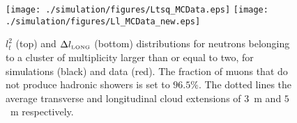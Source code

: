 \begin{figure}[htb]
    \centering
   \texttt{[image: ./simulation/figures/Ltsq\_MCData.eps]}
    \texttt{[image: ./simulation/figures/Ll\_MCData\_new.eps]}
    
    
    \caption{$l_t^2$ (top) and $\Delta l_{\mbox{\tiny LONG}}$ (bottom) distributions for neutrons belonging to a cluster of multiplicity larger than or equal to two, for simulations (black) and data (red). The fraction of muons that do not produce hadronic showers is set to $96.5\%$. The dotted lines the average transverse and longitudinal cloud extensions of $3$~m and $5$~m respectively.}
    \label{fig:neutroncloudcompare}
\end{figure}

